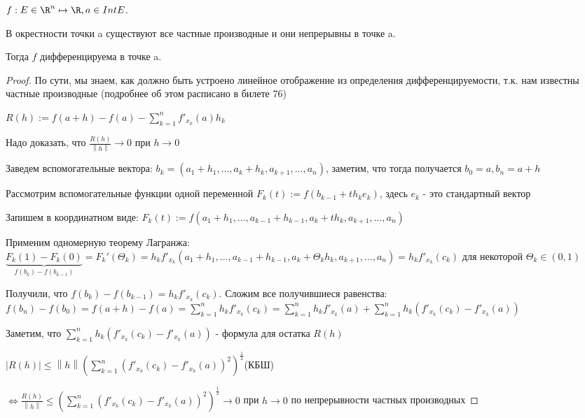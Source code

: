 
\begin{theorem} \thmslashn

    $f : E \in \R^n \mapsto \R, a \in Int E$.

    В окрестности точки a существуют все частные производные и они непрерывны в точке a.

    Тогда $f$ дифференцируема в точке a.


    \begin{proof} \thmslashn

	По сути, мы знаем, как должно быть устроено линейное отображение из определения дифференцируемости, т.к. нам известны частные производные (подробнее об этом расписано в билете 76)

	$R(h) := f(a + h) - f(a) - \sum_{k = 1}^n f'_{x_k}(a)h_k$

	Надо доказать, что $\frac{R(h)}{\left\| h \right\|} \to 0$ при $h \to 0$

	Заведем вспомогательные вектора: $b_k = (a_1 + h_1, ..., a_k + h_k, a_{k + 1}, ..., a_n)$, заметим, что тогда получается $b_0 = a, b_n = a + h$

	Рассмотрим вспомогательные функции одной переменной $F_k(t) := f(b_{k - 1} + th_ke_k)$, здесь $e_k$ - это стандартный вектор
 
	Запишем в координатном виде: $F_k(t) := f(a_1 + h_1, ..., a_{k - 1} + h_{k - 1}, a_k + th_k, a_{k + 1}, ..., a_n)$

	Применим одномерную теорему Лагранжа: $\underbrace{F_k(1) - F_k(0)}_{f(b_k) - f(b_{k - 1})} = F_k'(\Theta_k) = h_kf'_{x_k}(a_1 + h_1, ..., a_{k - 1} + h_{k - 1}, a_k + \Theta_kh_k, a_{k + 1},...,a_n) = h_kf'_{x_k}(c_k)$ для некоторой $\Theta_k \in (0, 1)$

	Получили, что $f(b_k) - f(b_{k - 1}) = h_kf'_{x_k}(c_k)$. Сложим все получившиеся равенства: $f(b_n) - f(b_0) = f(a + h) - f(a) = \sum_{k = 1}^n h_kf'_{x_k}(c_k) = \sum_{k = 1}^n h_kf'_{x_k}(a) + \sum_{k = 1}^n h_k(f'_{x_k}(c_k) - f'_{x_k}(a))$

	Заметим, что $\sum_{k = 1}^n h_k(f'_{x_k}(c_k) - f'_{x_k}(a))$ - формула для остатка $R(h)$

	$\left| R(h)\right| \le \left\| h \right\| (\sum_{k = 1}^n(f'_{x_k}(c_k) - f'_{x_k}(a))^2)^{\frac{1}{2}}$(КБШ)

	$\iff \frac{R(h)}{\left\| h \right\|} \le (\sum_{k = 1}^n(f'_{x_k}(c_k) - f'_{x_k}(a))^2)^{\frac{1}{2}} \to 0$ при $h \to 0$ по непрерывности частных производных


\end{proof}
\end{theorem}
